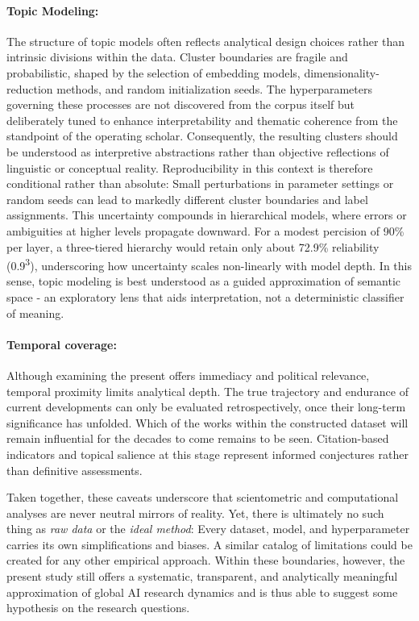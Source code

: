 \documentclass{article}
\begin{document}
	\paragraph{Topic Modeling:} The structure of topic models often reflects analytical design choices rather than intrinsic divisions within the data. Cluster boundaries are fragile and probabilistic, shaped by the selection of embedding models, dimensionality-reduction methods, and random initialization seeds. The hyperparameters governing these processes are not discovered from the corpus itself but deliberately tuned to enhance interpretability and thematic coherence from the standpoint of the operating scholar. Consequently, the resulting clusters should be understood as interpretive abstractions rather than objective reflections of linguistic or conceptual reality. Reproducibility in this context is therefore conditional rather than absolute: Small perturbations in parameter settings or random seeds can lead to markedly different cluster boundaries and label assignments. This uncertainty compounds in hierarchical models, where errors or ambiguities at higher levels propagate downward. For a modest percision of 90\% per layer, a three-tiered hierarchy would retain only about 72.9\% reliability (0.9\textsuperscript{3}), underscoring how uncertainty scales non-linearly with model depth. In this sense, topic modeling is best understood as a guided approximation of semantic space - an exploratory lens that aids interpretation, not a deterministic classifier of meaning.
	
	\paragraph{Temporal coverage:} Although examining the present offers immediacy and political relevance, temporal proximity limits analytical depth. The true trajectory and endurance of current developments can only be evaluated retrospectively, once their long-term significance has unfolded. Which of the works within the constructed dataset will remain influential for the decades to come remains to be seen. Citation-based indicators and topical salience at this stage represent informed conjectures rather than definitive assessments.
	
	Taken together, these caveats underscore that scientometric and computational analyses are never neutral mirrors of reality. Yet, there is ultimately no such thing as \textit{raw data} or the \textit{ideal method}: Every dataset, model, and hyperparameter carries its own simplifications and biases. A similar catalog of limitations could be created for any other empirical approach. Within these boundaries, however, the present study still offers a systematic, transparent, and analytically meaningful approximation of global AI research dynamics and is thus able to suggest some hypothesis on the research questions.
	
\end{document}
